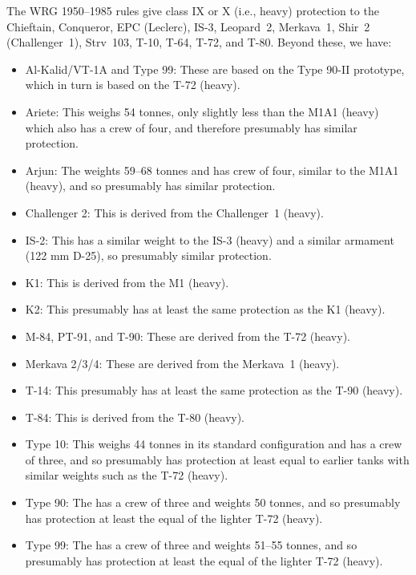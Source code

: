 \begin{withcounters}
{        
        The WRG 1950--1985 rules give class IX or X (i.e., heavy) protection to the
        Chieftain,
        Conqueror,
        EPC (Leclerc),
        IS-3,
        Leopard~2,
        Merkava~1,
        Shir~2 (Challenger~1),
        Strv~103,
        T-10,
        T-64,
        T-72, and
        T-80.
        Beyond these, we have:
        \begin{itemize}
            \item Al-Kalid/VT-1A and Type 99: These are based on the Type 90-II prototype, which in turn is based on the T-72 (heavy).
            \item Ariete: This weighs 54 tonnes, only slightly less than the M1A1 (heavy) which also has a crew of four, and therefore presumably has similar protection.
            \item Arjun: The weights 59--68 tonnes and has crew of four, similar to the M1A1 (heavy), and so presumably has similar protection.
            \item Challenger 2: This is derived from the Challenger~1 (heavy).
            \item IS-2: This has a similar weight to the IS-3 (heavy) and a similar armament (122 mm D-25), so presumably similar protection.
            \item K1: This is derived from the M1 (heavy).
            \item K2: This presumably has at least the same protection as the K1 (heavy).
            \item M-84, PT-91, and T-90: These are derived from the T-72 (heavy).
            \item Merkava 2/3/4: These are derived from the Merkava~1 (heavy).
            \item T-14: This presumably has at least the same protection as the T-90 (heavy).
            \item T-84: This is derived from the T-80 (heavy).
            \item Type 10: This weighs 44 tonnes in its standard configuration and has a crew of three, and so presumably has protection at least equal to earlier tanks with similar weights such as the T-72 (heavy).
            \item Type 90: The has a crew of three and weights 50 tonnes, and so presumably has protection at least the equal of the lighter T-72 (heavy).
            \item Type 99: The has a crew of three and weights 51--55 tonnes, and so presumably has protection at least the equal of the lighter T-72 (heavy).
        \end{itemize}

}
\end{withcounters}
